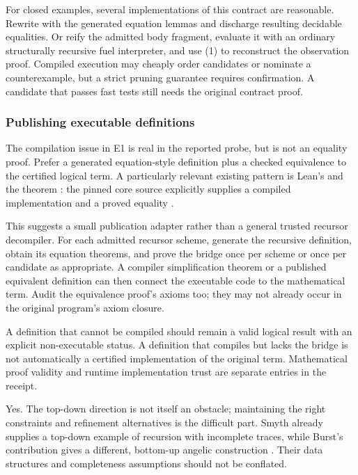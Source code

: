 For closed examples, several implementations of this contract are reasonable. Rewrite with the generated equation lemmas and discharge resulting decidable equalities. Or reify the admitted body fragment, evaluate it with an ordinary structurally recursive fuel interpreter, and use (1) to reconstruct the observation proof. Compiled execution may cheaply order candidates or nominate a counterexample, but a strict pruning guarantee requires confirmation. A candidate that passes fast tests still needs the original contract proof.

\subsubsection*{Publishing executable definitions}

The compilation issue in E1 is real in the reported probe, but  is not an equality proof. Prefer a generated equation-style definition plus a checked equivalence to the certified logical term. A particularly relevant existing pattern is Lean's  and the  theorem : the pinned core source explicitly supplies a compiled implementation and a proved equality \cite{leanreccompiled}.

This suggests a small publication adapter rather than a general trusted recursor decompiler. For each admitted recursor scheme, generate the recursive definition, obtain its equation theorems, and prove the bridge once per scheme or once per candidate as appropriate. A compiler simplification theorem or a published equivalent definition can then connect the executable code to the mathematical term. Audit the equivalence proof's axioms too; they may not already occur in the original program's axiom closure.

A definition that cannot be compiled should remain a valid logical result with an explicit non-executable status. A definition that compiles but lacks the bridge is not automatically a certified implementation of the original term. Mathematical proof validity and runtime implementation trust are separate entries in the receipt.

\ans Yes. The top-down direction is not itself an obstacle; maintaining the right constraints and refinement alternatives is the difficult part. Smyth already supplies a top-down example of recursion with incomplete traces, while Burst's contribution gives a different, bottom-up angelic construction \cite{smyth,burst}. Their data structures and completeness assumptions should not be conflated.

